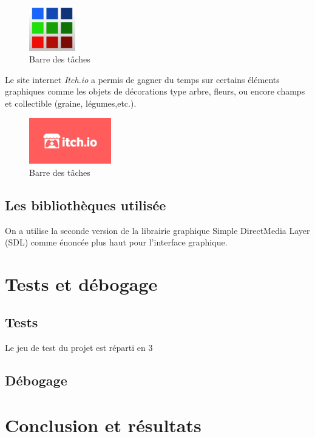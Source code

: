 \documentclass{article}
\begin{document}
\begin{figure}[h]  
\includegraphics[height = 2cm]{piskel.jpeg}
\centering
\caption{Barre des tâches}
\label{fig:logo2}
\end{figure}



Le site internet \textit{Itch.io} a permis de gagner du temps sur certains éléments graphiques comme les objets de décorations type arbre, fleurs, ou encore champs et collectible (graine, légumes,etc.). 
    
    \begin{figure}[h]  
        \includegraphics[height = 2cm]{itch.io.png}
        \centering
        \caption{Barre des tâches}
        \label{fig:logo3}
    \end{figure}

\subsection{Les bibliothèques utilisée}
On a utilise la seconde version de la librairie graphique Simple DirectMedia Layer (SDL) comme énoncée plus haut pour l'interface graphique.

\newpage

\section{Tests et débogage}

\subsection{Tests}

Le jeu de test du projet est réparti en 3
\subsection{Débogage}




\section{Conclusion et résultats}
\end{document}
